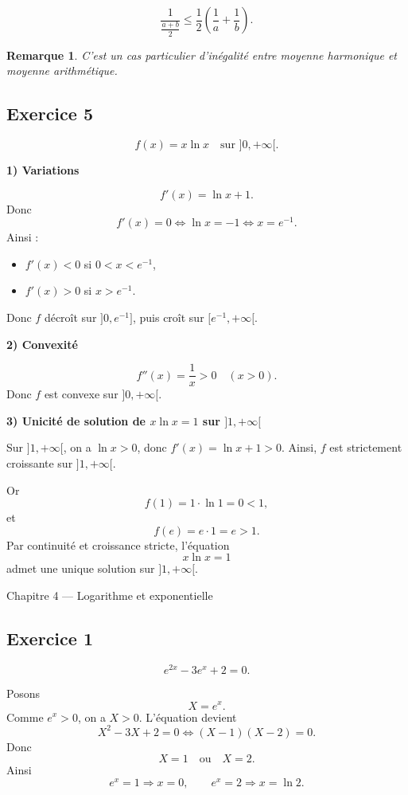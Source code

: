 \documentclass[11pt,a4paper]{article}
\newtheorem*{remarque}{Remarque}
\begin{document}
\[
\boxed{\frac{1}{\frac{a+b}{2}} \leq \frac12\left(\frac1a+\frac1b\right).}
\]

\begin{remarque}
C'est un cas particulier d'inégalité entre moyenne harmonique et moyenne arithmétique.
\end{remarque}

\subsection*{Exercice 5}
\[
f(x)=x\ln x \quad \text{sur } ]0,+\infty[.
\]

\textbf{1) Variations}

\[
f'(x)=\ln x+1.
\]
Donc
\[
f'(x)=0 \iff \ln x=-1 \iff x=e^{-1}.
\]
Ainsi :
\begin{itemize}
    \item \(f'(x)<0\) si \(0<x<e^{-1}\),
    \item \(f'(x)>0\) si \(x>e^{-1}\).
\end{itemize}
Donc \(f\) décroît sur \(]0,e^{-1}]\), puis croît sur \([e^{-1},+\infty[\).

\textbf{2) Convexité}

\[
f''(x)=\frac1x>0 \quad (x>0).
\]
Donc \(f\) est convexe sur \(]0,+\infty[\).

\textbf{3) Unicité de solution de \(x\ln x=1\) sur \(]1,+\infty[\)}

Sur \(]1,+\infty[\), on a \(\ln x>0\), donc \(f'(x)=\ln x+1>0\).  
Ainsi, \(f\) est strictement croissante sur \(]1,+\infty[\).

Or
\[
f(1)=1\cdot \ln 1=0<1,
\]
et
\[
f(e)=e\cdot 1=e>1.
\]
Par continuité et croissance stricte, l'équation
\[
x\ln x=1
\]
admet une unique solution sur \(]1,+\infty[\).

\begin{chapitrebox}{Chapitre 4 --- Logarithme et exponentielle}
\end{chapitrebox}

\subsection*{Exercice 1}
\[
e^{2x}-3e^x+2=0.
\]

Posons
\[
X=e^x.
\]
Comme \(e^x>0\), on a \(X>0\). L'équation devient
\[
X^2-3X+2=0
\iff (X-1)(X-2)=0.
\]
Donc
\[
X=1 \quad \text{ou} \quad X=2.
\]
Ainsi
\[
e^x=1 \Rightarrow x=0,
\qquad
e^x=2 \Rightarrow x=\ln 2.
\]
\end{document}
